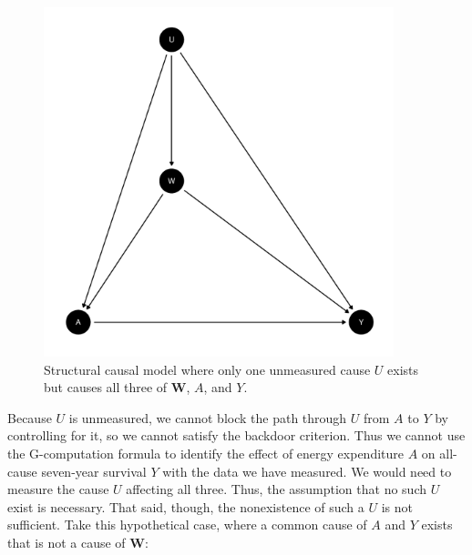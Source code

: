 \documentclass{article}\usepackage[]{graphicx}\usepackage[]{xcolor}
\newenvironment{knitrout}{}{} %
\begin{document}
\begin{figure}[H]
  \caption{Structural causal model where only one unmeasured cause $U$ exists but causes all three of $\bm{W}$, $A$, and $Y$.}
      
\begin{knitrout}
\color{fgcolor}
\includegraphics[width=4in]{figure/unnamed-chunk-6-1} 

\end{knitrout}

\end{figure}

Because $U$ is unmeasured, we cannot block the path through $U$ from $A$ to $Y$ by controlling for it, so we cannot satisfy the backdoor criterion. Thus we cannot use the G-computation formula to identify the effect of energy expenditure $A$ on all-cause seven-year survival $Y$ with the data we have measured. We would need to measure the cause $U$ affecting all three. Thus, the assumption that no such $U$ exist is necessary. That said, though, the nonexistence of such a $U$ is not sufficient. Take this hypothetical case, where a common cause of $A$ and $Y$ exists that is not a cause of $\bm{W}$:
\end{document}
